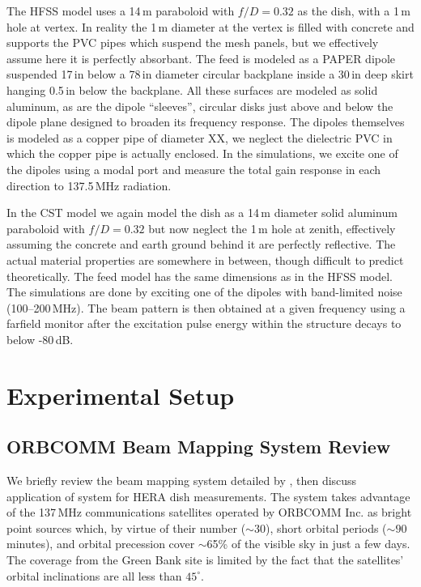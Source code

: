 \documentclass{emulateapj}
\begin{document}
The HFSS model uses a 14\,m paraboloid with $f/D=0.32$ as the dish, with a 1\,m hole at vertex. In reality the 1\,m diameter at the vertex is filled with concrete and supports the PVC pipes which suspend the mesh panels, but we effectively assume here it is perfectly absorbant.  The feed is modeled as a PAPER dipole suspended 17\,in below a 78\,in diameter circular backplane inside a 30\,in deep skirt hanging 0.5\,in below the backplane. All these surfaces are modeled as solid aluminum, as are the dipole ``sleeves'', circular disks just above and below the dipole plane designed to broaden its frequency response. The dipoles themselves is modeled as a copper pipe of diameter XX, we neglect the dielectric PVC in which the copper pipe is actually enclosed. In the simulations, we excite one of the dipoles using a modal port and measure the total gain response in each direction to 137.5\,MHz radiation.

In the CST model we again model the dish as a 14\,m diameter solid aluminum paraboloid with $f/D=0.32$ but now neglect the 1\,m hole at zenith, effectively assuming the concrete and earth ground behind it are perfectly reflective. The actual material properties are somewhere in between, though difficult to predict theoretically. The feed model has the same dimensions as in the HFSS model. The simulations are done by exciting one of the dipoles with band-limited noise (100--200\,MHz). The beam pattern is then obtained at a given frequency using a farfield monitor after the excitation pulse energy within the structure decays to below -80\,dB.

\section{Experimental Setup}

\subsection{ORBCOMM Beam Mapping System Review}

We briefly review the beam mapping system detailed by \citet{neben15}, then discuss 
application of system for HERA dish measurements. The system 
takes advantage of the 137\,MHz communications satellites operated by ORBCOMM Inc. 
as bright point sources which, by virtue of their number ($\sim30$), short orbital periods 
($\sim90$ minutes), and orbital precession cover $\sim$65\% of the visible sky in just a few 
days. The coverage from the Green Bank site is limited by the fact that the satellites' orbital inclinations are all less 
than $45^\circ$. 
\end{document}
